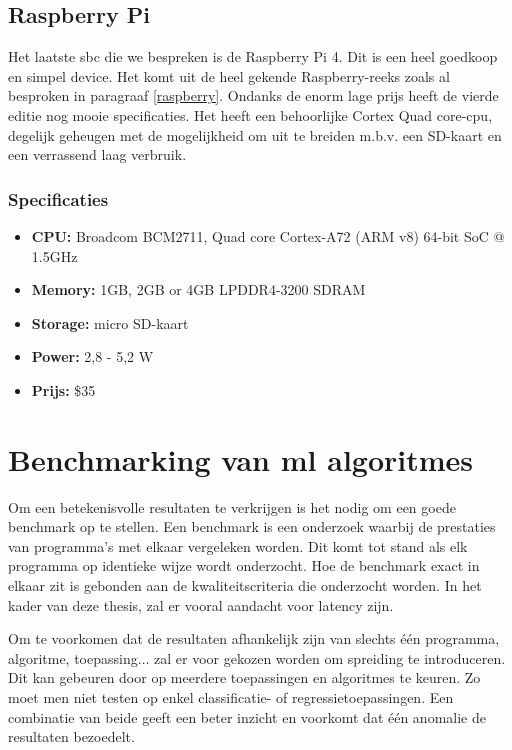 	
	\subsection{Raspberry Pi}
	Het laatste \gls{sbc} die we bespreken is de Raspberry Pi 4\citep{bron:rpi4}. Dit is een heel goedkoop en simpel device. Het komt uit de heel gekende Raspberry-reeks zoals al besproken in paragraaf \ref{raspberry}. Ondanks de enorm lage prijs heeft de vierde editie nog mooie specificaties. Het heeft een behoorlijke Cortex Quad core-\gls{cpu}, degelijk geheugen met de mogelijkheid om uit te breiden m.b.v. een SD-kaart en een verrassend laag verbruik. 
	
		\subsubsection{Specificaties}
		\begin{itemize}
			\item \textbf{CPU:} Broadcom BCM2711, Quad core Cortex-A72 (ARM v8) 64-bit SoC @ 1.5GHz
			\item \textbf{Memory:} 1GB, 2GB or 4GB LPDDR4-3200 SDRAM 
			\item \textbf{Storage:}  micro SD-kaart
			\item \textbf{Power:} 2,8 - 5,2 W
			\item \textbf{Prijs:} \$35
		\end{itemize}	
	
\newpage

\section{Benchmarking van \gls{ml} algoritmes}
\label{benchmark}

Om een betekenisvolle resultaten te verkrijgen is het nodig om een goede benchmark op te stellen. Een benchmark is een onderzoek waarbij de prestaties van programma's met elkaar vergeleken worden. Dit komt tot stand als elk programma op identieke wijze wordt onderzocht. Hoe de benchmark exact in elkaar zit is gebonden aan de kwaliteitscriteria die onderzocht worden. In het kader van deze thesis, zal er vooral aandacht voor latency zijn.

Om te voorkomen dat de resultaten afhankelijk zijn van slechts \'e\'en programma, algoritme, toepassing$\dots$ zal er voor gekozen worden om spreiding te introduceren. Dit kan gebeuren door op meerdere toepassingen en algoritmes te keuren. Zo moet men niet testen op enkel classificatie- of regressietoepassingen. Een combinatie van beide geeft een beter inzicht en voorkomt dat \'e\'en anomalie de resultaten bezoedelt. 


